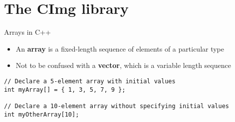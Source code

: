 \part{The CImg library}
\frame{\partpage}

\begin{frame}[fragile]{Arrays in C++}
    \begin{itemize}
        \item An \textbf{array} is a fixed-length sequence of elements of a particular type \pause
        \item Not to be confused with a \textbf{vector}, which is a variable length sequence \pause
    \end{itemize}
    \begin{lstlisting}
// Declare a 5-element array with initial values
int myArray[] = { 1, 3, 5, 7, 9 };

// Declare a 10-element array without specifying initial values
int myOtherArray[10];
    \end{lstlisting}
\end{frame}
